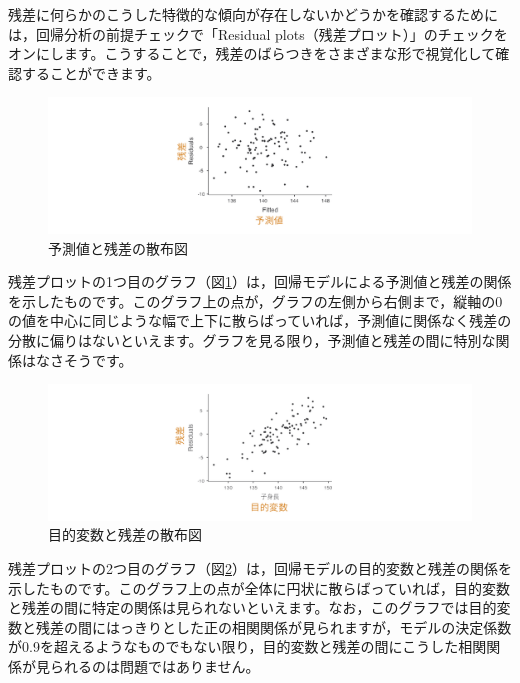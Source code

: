 \documentclass[
  12pt,
  a5jpaper,
  lualatex, ja=standard]{bxjsbook}
\begin{document}
残差に何らかのこうした特徴的な傾向が存在しないかどうかを確認するためには，回帰分析の前提チェックで「Residual plots（残差プロット）」のチェックをオンにします。こうすることで，残差のばらつきをさまざまな形で視覚化して確認することができます。

\begin{figure}[!ht]

{\centering \includegraphics[width=1\linewidth]{images/regression/lr-assumption-resplot1} 

}

\caption{予測値と残差の散布図}\label{fig:regression-lr-assumption-resplot1}
\end{figure}

残差プロットの1つ目のグラフ（図\ref{fig:regression-lr-assumption-resplot1}）は，回帰モデルによる予測値と残差の関係を示したものです。このグラフ上の点が，グラフの左側から右側まで，縦軸の0の値を中心に同じような幅で上下に散らばっていれば，予測値に関係なく残差の分散に偏りはないといえます。グラフを見る限り，予測値と残差の間に特別な関係はなさそうです。

\begin{figure}[!ht]

{\centering \includegraphics[width=1\linewidth]{images/regression/lr-assumption-resplot2} 

}

\caption{目的変数と残差の散布図}\label{fig:regression-lr-assumption-resplot2}
\end{figure}

残差プロットの2つ目のグラフ（図\ref{fig:regression-lr-assumption-resplot2}）は，回帰モデルの目的変数と残差の関係を示したものです。このグラフ上の点が全体に円状に散らばっていれば，目的変数と残差の間に特定の関係は見られないといえます。なお，このグラフでは目的変数と残差の間にはっきりとした正の相関関係が見られますが，モデルの決定係数が0.9を超えるようなものでもない限り，目的変数と残差の間にこうした相関関係が見られるのは問題ではありません。
\end{document}
